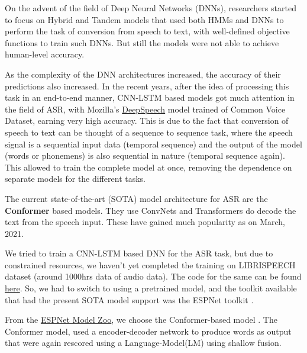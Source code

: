 \documentclass[14pt,a4paper]{article}
\begin{document}
On the advent of the field of Deep Neural Networks (DNNs), researchers started to focus on Hybrid and Tandem models that used both HMMs and DNNs to perform the task of conversion from speech to text, with well-defined objective functions to train such DNNs. But still the models were not able to achieve human-level accuracy.

As the complexity of the DNN architectures increased, the accuracy of their predictions also increased. In the recent years, after the idea of processing this task in an end-to-end manner, CNN-LSTM based models got much attention in the field of ASR, with Mozilla's \href{https://github.com/mozilla/DeepSpeech-examples}{DeepSpeech} model trained of Common Voice Dataset, earning very high accuracy. This is due to the fact that conversion of speech to text can be thought of a sequence to sequence task, where the speech signal is a sequential input data (temporal sequence) and the output of the model (words or phonemens) is also sequential in nature (temporal sequence again). This allowed to train the complete model at once, removing the dependence on separate models for the different tasks.

The current state-of-the-art (SOTA) model architecture for ASR are the \textbf{Conformer} \cite{conformer} based models. They use ConvNets and Transformers do decode the text from the speech input. These have gained much popularity as on March, 2021.

We tried to train a CNN-LSTM based DNN for the ASR task, but due to constrained resources, we haven't yet completed the training on LIBRISPEECH \cite{librispeech} dataset (around 1000hrs data of audio data). The code for the same can be found \href{https://github.com/soham2109/CS-753-Project/tree/main/shivam_machine}{here}. So, we had to switch to using a pretrained model, and the toolkit available that had the present SOTA model support was the ESPNet toolkit \cite{espnet}.

From the \href{https://github.com/espnet/espnet_model_zoo}{ESPNet Model Zoo}, we choose the Conformer-based model \cite{espnet_model}. The Conformer model, used a encoder-decoder network to produce words as output that were again rescored using a Language-Model(LM) using shallow fusion.
\end{document}

